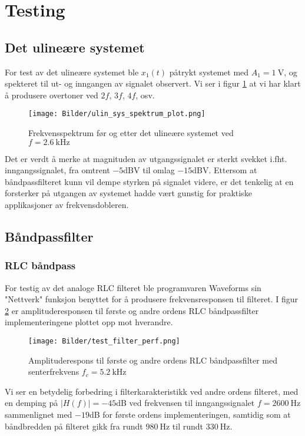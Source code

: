 \newpage
\section{Testing}

\subsection{Det ulineære systemet}
For test av det ulineære systemet ble $x_1(t)$ påtrykt systemet med $A_1 = \SI{1}{\volt}$, og 
spekteret til ut- og inngangen av signalet observert. Vi ser i figur \ref{fig:test_ulin_sys} at 
vi har klart å produsere overtoner ved $2f$, $3f$, $4f$, osv.
\begin{figure}[H]
    \centering 
    \texttt{[image: Bilder/ulin\_sys\_spektrum\_plot.png]}
    \caption{Frekvensspektrum før og etter det ulineære systemet ved $f = \SI{2.6}{\kilo\hertz}$}
    \label{fig:test_ulin_sys}
\end{figure}

Det er verdt å merke at magnituden av utgangssignalet er sterkt svekket i.fht. inngangssignalet, fra omtrent $-5$dBV
til omlag $-15$dBV. Ettersom at båndpassfilteret kunn vil dempe styrken på signalet videre, er det tenkelig 
at en forsterker på utgangen av systemet hadde vært gunstig for praktiske applikasjoner av frekvensdobleren.

\subsection{Båndpassfilter}
\subsubsection{RLC båndpass}
For testig av det analoge RLC filteret ble programvaren Waveforms \cite{waveforms} sin "Nettverk" funksjon 
benyttet for å produsere frekvensresponsen til filteret. I figur \ref{fig:test_analog_filter_perf} er 
amplituderesponsen til første og andre ordens RLC båndpassfilter implementeringene plottet opp mot hverandre.

\begin{figure}[H]
    \centering 
    \texttt{[image: Bilder/test\_filter\_perf.png]}
    \caption{Amplituderespons til første og andre ordens RLC båndpassfilter med senterfrekvens $f_c = \SI{5.2}{\kilo\hertz}$}
    \label{fig:test_analog_filter_perf}
\end{figure}

Vi ser en betydelig forbedring i filterkarakteristikk ved andre ordens filteret, med en demping på $|H(f)| = -45$dB ved 
frekvensen til inngangssignalet $f = \SI{2600}{\hertz}$ sammenlignet med $-19$dB for første ordens implementeringen, samtidig som at
båndbredden på filteret gikk fra rundt $\SI{980}{\hertz}$ til rundt $\SI{330}{\hertz}$.

